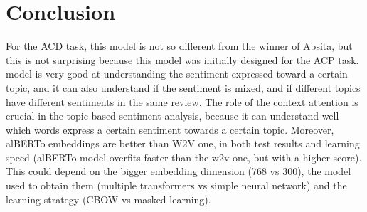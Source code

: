 \documentclass{article}
\begin{document}
    \section{Conclusion}\label{sec:s6}
        For the ACD task, this model is not so different from the winner of Absita, but this is not surprising because this model was initially designed for the ACP task.
        model is very good at understanding the sentiment expressed toward a certain topic, and it can also understand
        if the sentiment is mixed, and if different topics have different sentiments in the same review.
        The role of the context attention is crucial in the topic based sentiment analysis, because it can understand well which words express a certain sentiment towards a certain topic.
        Moreover, alBERTo embeddings are better than W2V one, in both test results and learning speed (alBERTo model overfits faster than the w2v one, but with a higher score).
        This could depend on the bigger embedding dimension (768 vs 300), the model used to obtain them
        (multiple transformers vs simple neural network) and the learning strategy (CBOW vs masked learning).
\end{document}

